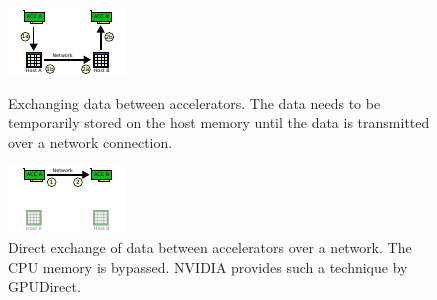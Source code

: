\begin{figure}[H]
  \begin{minipage}[t]{0.5\textwidth} 
    \includegraphics[width=\textwidth]{graphics/60_acc_memcpy}
    \caption{Exchanging data between accelerators. The data needs to be
    temporarily stored on the host memory until the data is
    transmitted over a network connection.}
    \label{fig:acc_memcpy}
  \end{minipage}%
  \begin{minipage}[t]{0.5\textwidth}
    \includegraphics[width=\textwidth]{graphics/60_gpudirect}
    \caption{Direct exchange of data between accelerators over
      a network. The CPU memory is bypassed. NVIDIA provides such a
      technique by GPUDirect.}
    \label{fig:gpudirect}
  \end{minipage}%

\end{figure}


